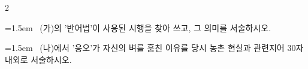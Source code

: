 \documentclass[10pt, a4paper]{article}
\begin{document}
\begin{multicols}{2}
\noindent\begin{minipage}{\columnwidth}
\vspace{2mm}
{\hangindent=1.5em  ~(가)의 '반어법'이 사용된 시행을 찾아 쓰고, 그 의미를 서술하시오.\par}

\vspace{3mm}
\noindent\hrulefill
\vspace{2.5mm}
\noindent\hrulefill
\vspace{2.5mm}
\noindent\hrulefill
\vspace{2.5mm}
\noindent\hrulefill
\vspace{2.5mm}
\noindent\hrulefill
\vspace{2.5mm}
\vspace{1mm}
\vspace{4mm}
\end{minipage}
\par

\noindent\begin{minipage}{\columnwidth}
\vspace{2mm}
{\hangindent=1.5em  ~(나)에서 '응오'가 자신의 벼를 훔친 이유를 당시 농촌 현실과 관련지어 30자 내외로 서술하시오.\par}

\vspace{3mm}
\noindent\hrulefill
\vspace{2.5mm}
\noindent\hrulefill
\vspace{2.5mm}
\noindent\hrulefill
\vspace{2.5mm}
\noindent\hrulefill
\vspace{2.5mm}
\noindent\hrulefill
\vspace{2.5mm}
\vspace{1mm}
\vspace{4mm}
\end{minipage}
\par


\vspace{1mm}
\vspace{0.5mm}


\end{multicols}
\end{document}
